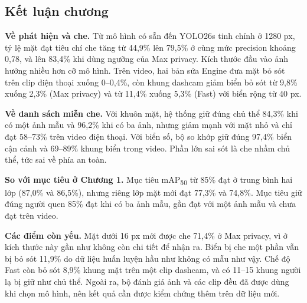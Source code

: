 \subsection{Kết luận chương}

\textbf{Về phát hiện và che.} Từ mô hình có sẵn đến YOLO26s tinh chỉnh ở 1280 px, tỷ lệ mặt đạt tiêu chí che tăng từ 44,9\% lên 79,5\% ở cùng mức precision khoảng 0,78, và lên 83,4\% khi dùng ngưỡng của Max privacy. Kích thước đầu vào ảnh hưởng nhiều hơn cỡ mô hình. Trên video, hai bản sửa Engine đưa mặt bỏ sót trên clip điện thoại xuống 0--0,4\%, còn khung dashcam giảm biển bỏ sót từ 9,8\% xuống 2,3\% (Max privacy) và từ 11,4\% xuống 5,3\% (Fast) với biển rộng từ 40 px.

\textbf{Về danh sách miễn che.} Với khuôn mặt, hệ thống giữ đúng chủ thể 84,3\% khi có một ảnh mẫu và 96,2\% khi có ba ảnh, nhưng giảm mạnh với mặt nhỏ và chỉ đạt 58--73\% trên video điện thoại. Với biển số, bộ so khớp giữ đúng 97,4\% biển cận cảnh và 69--89\% khung biển trong video. Phần lớn sai sót là che nhầm chủ thể, tức sai về phía an toàn.

\textbf{So với mục tiêu ở Chương 1.} Mục tiêu mAP\textsubscript{50} từ 85\% đạt ở trung bình hai lớp (87,0\% và 86,5\%), nhưng riêng lớp mặt mới đạt 77,3\% và 74,8\%. Mục tiêu giữ đúng người quen 85\% đạt khi có ba ảnh mẫu, gần đạt với một ảnh mẫu và chưa đạt trên video.

\textbf{Các điểm còn yếu.} Mặt dưới 16 px mới được che 71,4\% ở Max privacy, vì ở kích thước này gần như không còn chi tiết để nhận ra. Biển bị che một phần vẫn bị bỏ sót 11,9\% do dữ liệu huấn luyện hầu như không có mẫu như vậy. Chế độ Fast còn bỏ sót 8,9\% khung mặt trên một clip dashcam, và có 11--15 khung người lạ bị giữ như chủ thể. Ngoài ra, bộ đánh giá ảnh và các clip đều đã được dùng khi chọn mô hình, nên kết quả cần được kiểm chứng thêm trên dữ liệu mới.

